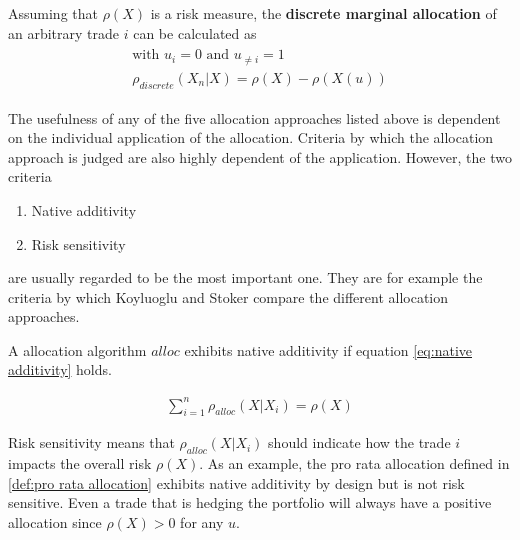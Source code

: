 \documentclass[../Thesis_AHoecherl.tex]{subfiles}
\begin{document}
\begin{definition}
    Assuming that $\rho(X)$ is a risk measure, the \textbf{discrete marginal allocation} of an arbitrary trade $i$ can be calculated as
    \begin{gather}
        \begin{split}
            \text{with } u_{i} = 0 \text{ and } u_{\neq i} = 1\\
            \rho_{discrete}\left(X_n|X\right) = \rho\left(X\right) - \rho\left(X\left(u\right)\right)    
        \end{split}
    \end{gather}
\end{definition}

\begin{definition}
\end{definition}

The usefulness of any of the five allocation approaches listed above is dependent on the individual application of the allocation. Criteria by which the allocation approach is judged are also highly dependent of the application. However, the two criteria
\begin{enumerate}
    \item Native additivity
    \item Risk sensitivity
\end{enumerate}
are usually regarded to be the most important one. They are for example the criteria by which Koyluoglu and Stoker \cite{koyluoglu2002risk} compare the different allocation approaches.

A allocation algorithm $alloc$ exhibits native additivity if equation \ref{eq:native additivity} holds.

\begin{align}
    \sum_{i=1}^n{\rho_{alloc}\left(X|X_i\right)} = \rho\left(X\right)
    \label{eq:native additivity}
\end{align}

Risk sensitivity means that $\rho_{alloc}\left(X|X_i\right)$ should indicate how the trade $i$ impacts the overall risk $\rho\left(X\right)$. As an example, the pro rata allocation defined in \ref{def:pro rata allocation} exhibits native additivity by design but is not risk sensitive. Even a trade that is hedging the portfolio will always have a positive allocation since $\rho\left(X\right) > 0$ for any $u$.
\end{document}
